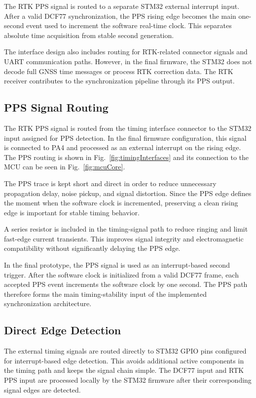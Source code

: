 The RTK PPS signal is routed to a separate STM32 external interrupt input. After a valid DCF77 synchronization, the PPS rising edge becomes the main one-second event used to increment the software real-time clock. This separates absolute time acquisition from stable second generation.

The interface design also includes routing for RTK-related connector signals and UART communication paths. However, in the final firmware, the STM32 does not decode full GNSS time messages or process RTK correction data. The RTK receiver contributes to the synchronization pipeline through its PPS output.

\subsection{PPS Signal Routing}

The RTK PPS signal is routed from the timing interface connector to the STM32 input assigned for PPS detection. In the final firmware configuration, this signal is connected to PA4 and processed as an external interrupt on the rising edge. The PPS routing is shown in Fig.~\ref{fig:timingInterfaces} and its connection to the MCU can be seen in Fig.~\ref{fig:mcuCore}.

The PPS trace is kept short and direct in order to reduce unnecessary propagation delay, noise pickup, and signal distortion. Since the PPS edge defines the moment when the software clock is incremented, preserving a clean rising edge is important for stable timing behavior.

A series resistor is included in the timing-signal path to reduce ringing and limit fast-edge current transients. This improves signal integrity and electromagnetic compatibility without significantly delaying the PPS edge.

In the final prototype, the PPS signal is used as an interrupt-based second trigger. After the software clock is initialized from a valid DCF77 frame, each accepted PPS event increments the software clock by one second. The PPS path therefore forms the main timing-stability input of the implemented synchronization architecture.

\subsection{Direct Edge Detection}

The external timing signals are routed directly to STM32 GPIO pins configured for interrupt-based edge detection. This avoids additional active components in the timing path and keeps the signal chain simple. The DCF77 input and RTK PPS input are processed locally by the STM32 firmware after their corresponding signal edges are detected.

